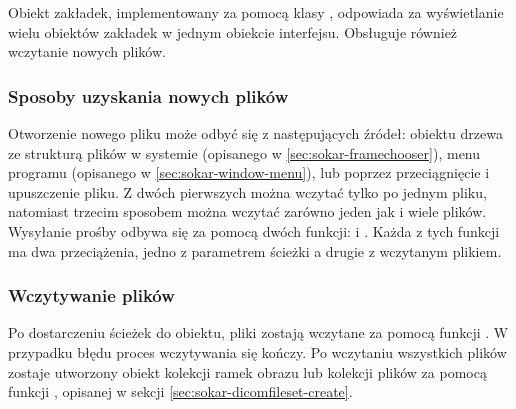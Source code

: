 \label{sec:sokar-dicomtabs}

\par
Obiekt zakładek, implementowany za pomocą klasy , odpowiada za wyświetlanie wielu obiektów zakładek w jednym obiekcie interfejsu.
Obsługuje również wczytanie nowych plików.

\subsubsection{Sposoby uzyskania nowych plików}

\par
Otworzenie nowego pliku może odbyć się z następujących źródeł: obiektu drzewa ze strukturą plików w systemie (opisanego w \ref{sec:sokar-framechooser}), menu programu (opisanego w \ref{sec:sokar-window-menu}), lub poprzez przeciągnięcie i upuszczenie pliku.
Z dwóch pierwszych można wczytać tylko po jednym pliku, natomiast trzecim sposobem można wczytać zarówno jeden jak i wiele plików.
Wysyłanie prośby odbywa się za pomocą dwóch funkcji:  i .
Każda z tych funkcji ma dwa przeciążenia, jedno z parametrem ścieżki a drugie z wczytanym plikiem.

\subsubsection{Wczytywanie plików}

\par
Po dostarczeniu ścieżek do obiektu, pliki zostają wczytane za pomocą funkcji .
W przypadku błędu proces wczytywania się kończy.
Po wczytaniu wszystkich plików zostaje utworzony obiekt kolekcji ramek obrazu lub kolekcji plików \DICOM za pomocą funkcji , opisanej w sekcji \ref{sec:sokar-dicomfileset-create}.
